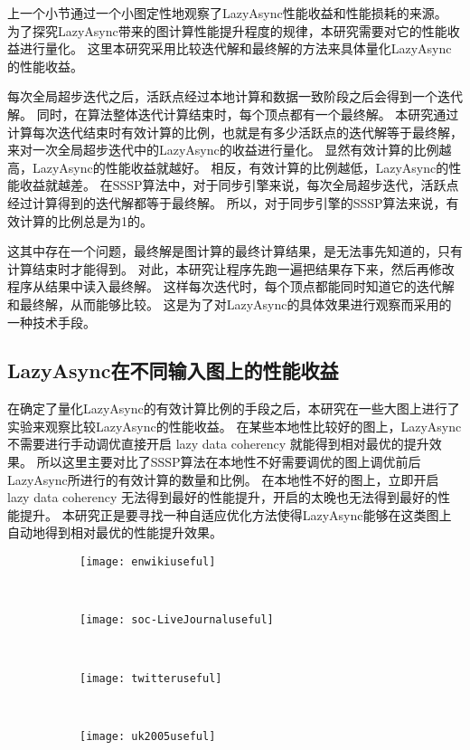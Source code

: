 上一个小节通过一个小图定性地观察了LazyAsync性能收益和性能损耗的来源。
为了探究LazyAsync带来的图计算性能提升程度的规律，本研究需要对它的性能收益进行量化。
这里本研究采用比较迭代解和最终解的方法来具体量化LazyAsync的性能收益。

每次全局超步迭代之后，活跃点经过本地计算和数据一致阶段之后会得到一个迭代解。
同时，在算法整体迭代计算结束时，每个顶点都有一个最终解。
本研究通过计算每次迭代结束时有效计算的比例，也就是有多少活跃点的迭代解等于最终解，
来对一次全局超步迭代中的LazyAsync的收益进行量化。
显然有效计算的比例越高，LazyAsync的性能收益就越好。
相反，有效计算的比例越低，LazyAsync的性能收益就越差。
在SSSP算法中，对于同步引擎来说，每次全局超步迭代，活跃点经过计算得到的迭代解都等于最终解。
所以，对于同步引擎的SSSP算法来说，有效计算的比例总是为1的。


这其中存在一个问题，最终解是图计算的最终计算结果，是无法事先知道的，只有计算结束时才能得到。
对此，本研究让程序先跑一遍把结果存下来，然后再修改程序从结果中读入最终解。
这样每次迭代时，每个顶点都能同时知道它的迭代解和最终解，从而能够比较。
这是为了对LazyAsync的具体效果进行观察而采用的一种技术手段。


\subsection{LazyAsync在不同输入图上的性能收益}

在确定了量化LazyAsync的有效计算比例的手段之后，本研究在一些大图上进行了实验来观察比较LazyAsync的性能收益。
在某些本地性比较好的图上，LazyAsync不需要进行手动调优直接开启 lazy data coherency 就能得到相对最优的提升效果。
所以这里主要对比了SSSP算法在本地性不好需要调优的图上调优前后LazyAsync所进行的有效计算的数量和比例。
在本地性不好的图上，立即开启 lazy data coherency 无法得到最好的性能提升，开启的太晚也无法得到最好的性能提升。
本研究正是要寻找一种自适应优化方法使得LazyAsync能够在这类图上自动地得到相对最优的性能提升效果。

\begin{figure}[!htbp]
  \centering
  \begin{subfigure}[b]{0.4\textwidth}
    \texttt{[image: enwikiuseful]}
    \caption{}
  \end{subfigure}%
  ~%
  \begin{subfigure}[b]{0.4\textwidth}
    \texttt{[image: soc-LiveJournaluseful]}
    \caption{}
  \end{subfigure}
  \\%
  \begin{subfigure}[b]{0.4\textwidth}
    \texttt{[image: twitteruseful]}
    \caption{}
  \end{subfigure}%
  ~%
  \begin{subfigure}[b]{0.4\textwidth}
    \texttt{[image: uk2005useful]}
    \caption{}
  \end{subfigure}
  \label{fig:useful}
\end{figure}


